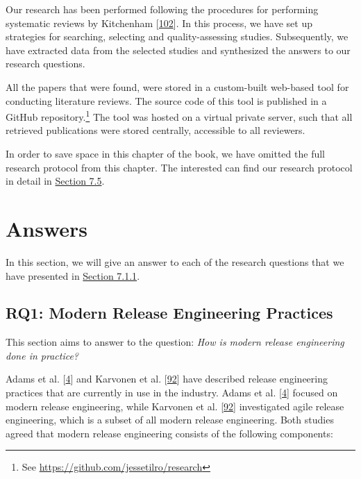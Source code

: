 \documentclass[]{book}
\let\rmarkdownfootnote\footnote%
\def\footnote{\protect\rmarkdownfootnote}
\begin{document}
Our research has been performed following the procedures for performing
systematic reviews by Kitchenham
{[}\protect\hyperlink{ref-kitchenham2004procedures}{102}{]}. In this
process, we have set up strategies for searching, selecting and
quality-assessing studies. Subsequently, we have extracted data from the
selected studies and synthesized the answers to our research questions.

All the papers that were found, were stored in a custom-built web-based
tool for conducting literature reviews. The source code of this tool is
published in a GitHub repository.\footnote{See
  \url{https://github.com/jessetilro/research}} The tool was hosted on a
virtual private server, such that all retrieved publications were stored
centrally, accessible to all reviewers.

In order to save space in this chapter of the book, we have omitted the
full research protocol from this chapter. The interested can find our
research protocol in detail in \protect\hyperlink{appendix}{Section
7.5}.

\section{Answers}\label{answers-3}

In this section, we will give an answer to each of the research
questions that we have presented in
\protect\hyperlink{research-questions-1}{Section 7.1.1}.

\subsection{RQ1: Modern Release Engineering
Practices}\label{rq1-modern-release-engineering-practices}

This section aims to answer to the question: \emph{How is modern release
engineering done in practice?}

Adams et al. {[}\protect\hyperlink{ref-adams2016a}{4}{]} and Karvonen et
al. {[}\protect\hyperlink{ref-karvonen2017a}{92}{]} have described
release engineering practices that are currently in use in the industry.
Adams et al. {[}\protect\hyperlink{ref-adams2016a}{4}{]} focused on
modern release engineering, while Karvonen et al.
{[}\protect\hyperlink{ref-karvonen2017a}{92}{]} investigated agile
release engineering, which is a subset of all modern release
engineering. Both studies agreed that modern release engineering
consists of the following components:
\end{document}
